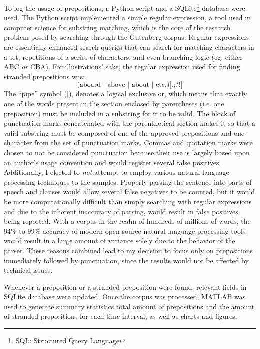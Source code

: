\documentclass[DIV=calc, paper=letter, fontsize=12pt]{scrartcl}	 %
\begin{document}
\begin{multicols}{2}
To log the usage of prepositions, a Python script and a SQLite\footnote{SQL: Structured Query Language} database were used. The Python script implemented a simple regular expression, a tool used in
computer science for substring matching, which is the core of the research problem posed by searching
through the Gutenberg corpus. Regular expressions are essentially enhanced search queries
that can search for matching characters in a set, repetitions of a series of characters, and
even branching logic (eg. either ABC \emph{or} CBA). For illustrations' sake, the regular expression used for 
finding stranded prepositions was: 
\begin{equation*}\text{(aboard $\vert$ above $\vert$ about $\vert$ etc.)[.;?!]}\end{equation*} The ``pipe'' symbol ($\vert$),
denotes a logical exclusive or, which means that exactly one of the words present in the section enclosed by
parentheses (i.e. one preposition) must be included in a substring for it to be valid. The block of punctuation marks 
concatenated with the parenthetical section makes it so that a valid substring must be composed of
one of the approved prepositions and one character from the set of punctuation marks. 
Commas and quotation marks were chosen to not be considered
punctuation because their use is largely based upon an author's usage convention and would register several
false positives. Additionally, I elected to \emph{not} attempt to employ various natural language processing
techniques to the samples. Properly parsing the sentence into parts of speech and clauses would 
allow several false negatives to be counted, but it would be more computationally difficult than simply searching with regular expressions and due to the inherent inaccuracy of parsing, would 
result in false positives being reported. With a corpus in the realm of hundreds of millions of words, 
the 94\% to 99\% accuracy of modern open source natural language processing tools would result
in a large amount of variance solely due to the behavior of the parser. These reasons combined lead
to my decision to focus only on prepositions immediately followed by punctuation, since the results
would not be affected by technical issues.

Whenever a preposition or a stranded preposition were found, relevant fields in SQLite database were updated. Once the corpus was processed, MATLAB was used to generate summary statistics total amount of prepositions and the amount of stranded prepositions for 
each time interval, as well as  charts and figures.   


\end{multicols}
\end{document}
